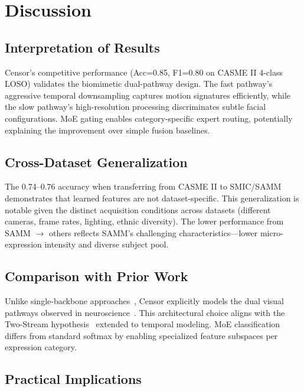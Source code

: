 
\section{Discussion}
\label{sec:discussion}

\subsection{Interpretation of Results}

Censor's competitive performance (Acc=0.85, F1=0.80 on CASME II 4-class LOSO) validates the biomimetic dual-pathway design. The fast pathway's aggressive temporal downsampling captures motion signatures efficiently, while the slow pathway's high-resolution processing discriminates subtle facial configurations. MoE gating enables category-specific expert routing, potentially explaining the improvement over simple fusion baselines.

\subsection{Cross-Dataset Generalization}

The 0.74--0.76 accuracy when transferring from CASME II to SMIC/SAMM demonstrates that learned features are not dataset-specific. This generalization is notable given the distinct acquisition conditions across datasets (different cameras, frame rates, lighting, ethnic diversity). The lower performance from SAMM $\rightarrow$ others reflects SAMM's challenging characteristics—lower micro-expression intensity and diverse subject pool.

\subsection{Comparison with Prior Work}

Unlike single-backbone approaches~\cite{ben2022survey}, Censor explicitly models the dual visual pathways observed in neuroscience~\cite{morris1999amygdala,kanwisher1997ffa}. This architectural choice aligns with the Two-Stream hypothesis~\cite{simonyan2014twostream} extended to temporal modeling. MoE classification differs from standard softmax by enabling specialized feature subspaces per expression category.

\subsection{Practical Implications}

